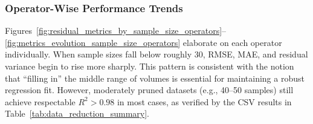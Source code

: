 \subsubsection{Operator-Wise Performance Trends}
\label{subsec:operator-wise-sample-size-analysis}

Figures~\ref{fig:residual_metrics_by_sample_size_operators}--\ref{fig:metrics_evolution_sample_size_operators} elaborate on each operator individually.
When sample sizes fall below roughly 30, \ac{RMSE}, \ac{MAE}, and residual variance begin to rise more sharply.
This pattern is consistent with the notion that “filling in” the middle range of volumes is essential for maintaining a robust regression fit.
However, moderately pruned datasets (e.g., 40–50 samples) still achieve respectable $R^2 > 0.98$ in most cases, as verified by the CSV results in Table~\ref{tab:data_reduction_summary}.

